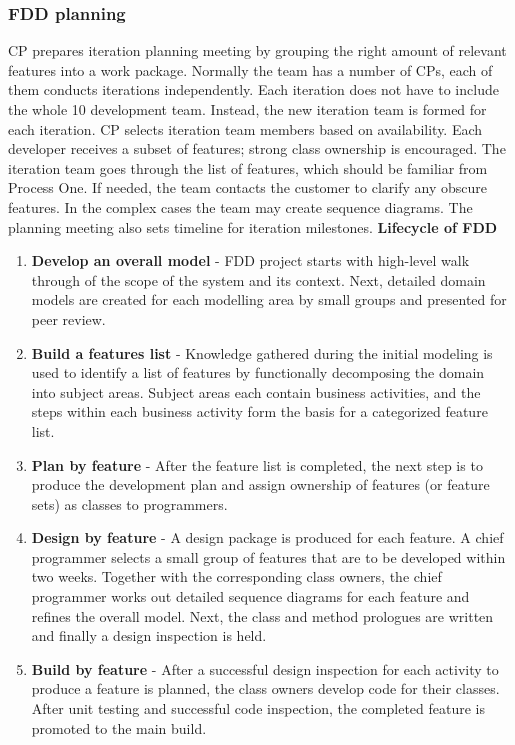 \subsubsection{FDD planning}
CP prepares iteration planning meeting by grouping the right amount of relevant
features into a work package. Normally the team has a number of CPs, each of them
conducts iterations independently. Each iteration does not have to include the whole 
10 development team. Instead, the new iteration team is formed for each iteration. CP selects
iteration team members based on availability. Each developer receives a subset of
features; strong class ownership is encouraged. The iteration team goes through the list of
features, which should be familiar from Process One. If needed, the team contacts the
customer to clarify any obscure features. In the complex cases the team may create
sequence diagrams. The planning meeting also sets timeline for iteration milestones.\cite{FDD_paper1} \newline
\newpage
\textbf{Lifecycle of FDD}
\begin{enumerate}
  \item \textbf{Develop an overall model} - FDD project starts with high-level walk through of the scope of the system and its context. Next, detailed domain models are created for each modelling area by small groups and presented for peer review.
  \item \textbf{Build a features list} - Knowledge gathered during the initial modeling is used to identify a list of features by functionally decomposing the domain into subject areas. Subject areas each contain business activities, and the steps within each business activity form the basis for a categorized feature list.
  \item \textbf{Plan by feature} - After the feature list is completed, the next step is to produce the development plan and assign ownership of features (or feature sets) as classes to programmers.
  \item \textbf{Design by feature} - A design package is produced for each feature. A chief programmer selects a small group of features that are to be developed within two weeks. Together with the corresponding class owners, the chief programmer works out detailed sequence diagrams for each feature and refines the overall model. Next, the class and method prologues are written and finally a design inspection is held.
  \item \textbf{Build by feature} - After a successful design inspection for each activity to produce a feature is planned, the class owners develop code for their classes. After unit testing and successful code inspection, the completed feature is promoted to the main build.
\end{enumerate}

